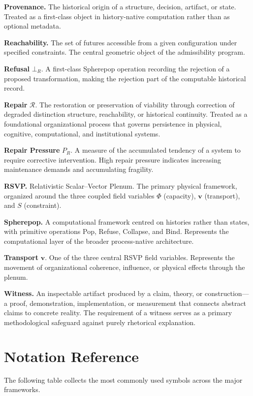 \documentclass[11pt, oneside]{book}
\theoremstyle{definition}
\theoremstyle{remark}
\begin{document}
\textbf{Provenance.} The historical origin of a structure, decision, artifact, or state. Treated as a first-class object in history-native computation rather than as optional metadata.

\textbf{Reachability.} The set of futures accessible from a given configuration under specified constraints. The central geometric object of the admissibility program.

\textbf{Refusal} $\bot_R$. A first-class Spherepop operation recording the rejection of a proposed transformation, making the rejection part of the computable historical record.

\textbf{Repair} $\mathcal{R}$. The restoration or preservation of viability through correction of degraded distinction structure, reachability, or historical continuity. Treated as a foundational organizational process that governs persistence in physical, cognitive, computational, and institutional systems.

\textbf{Repair Pressure} $P_R$. A measure of the accumulated tendency of a system to require corrective intervention. High repair pressure indicates increasing maintenance demands and accumulating fragility.

\textbf{RSVP.} Relativistic Scalar--Vector Plenum. The primary physical framework, organized around the three coupled field variables $\Phi$ (capacity), $\mathbf{v}$ (transport), and $S$ (constraint).

\textbf{Spherepop.} A computational framework centred on histories rather than states, with primitive operations Pop, Refuse, Collapse, and Bind. Represents the computational layer of the broader process-native architecture.

\textbf{Transport} $\mathbf{v}$. One of the three central RSVP field variables. Represents the movement of organizational coherence, influence, or physical effects through the plenum.

\textbf{Witness.} An inspectable artifact produced by a claim, theory, or construction—a proof, demonstration, implementation, or measurement that connects abstract claims to concrete reality. The requirement of a witness serves as a primary methodological safeguard against purely rhetorical explanation.

\chapter{Notation Reference}

The following table collects the most commonly used symbols across the major frameworks.
\end{document}
